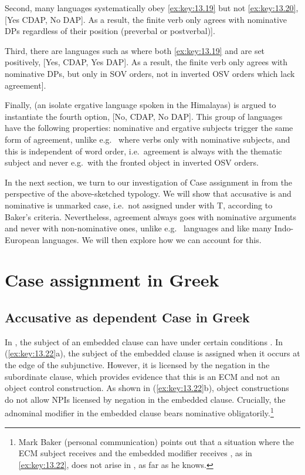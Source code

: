 \documentclass[output=paper]{langsci/langscibook}
\begin{document}
Second, many  languages systematically obey \eqref{ex:key:13.19} but
not \eqref{ex:key:13.20}, [Yes CDAP, No DAP]. As a result, the finite verb only
agrees with nominative DPs regardless of their position (preverbal or
postverbal)].

Third, there are languages such as  where both \eqref{ex:key:13.19} and
 are set positively, [Yes, CDAP, Yes DAP]. As a result, the
finite verb only agrees with nominative DPs, but only in SOV orders, not in
inverted OSV orders which lack agreement].

Finally,  (an isolate ergative language spoken in the Himalayas) is
argued to instantiate the fourth option, [No, CDAP, No DAP]. This group of
languages have the following properties: nominative and ergative subjects
trigger the same form of agreement, unlike e.g.\  where verbs  only
with nominative subjects, and this is independent of word order, i.e.\ agreement
is always with the thematic subject and never e.g.\ with the fronted object in
inverted OSV orders.

In the next section, we turn to our investigation of Case assignment in
 from the perspective of the above-sketched typology. We will show
that accusative is  and
nominative is unmarked case, i.e.\ not assigned under
 with T, according to Baker’s criteria. Nevertheless, agreement
always goes with nominative arguments and never with
non-nominative ones, unlike e.g.\  languages and like many Indo-European
languages. We will then explore how we can account for this.

\section{Case assignment in Greek}

\subsection{Accusative as dependent Case in Greek}

In , the subject of an embedded clause can have \Acc{} under certain
conditions \parencite{Iatridou1993,KotzPapa2007}. In (\ref{ex:key:13.22}a), the
subject of the embedded clause is assigned \Acc{} when it occurs at the edge of
the subjunctive. However, it is licensed by the negation in the subordinate
clause, which provides evidence that this is an \gls{ECM} and not an object
control construction. As shown in (\ref{ex:key:13.22}b), object 
constructions do not allow \glspl{NPI} licensed by negation in the embedded
clause.  Crucially, the adnominal modifier in the embedded clause bears
nominative obligatorily.\footnote{Mark Baker (personal
    communication) points out that a situation where the \gls{ECM} subject
receives \Acc{} and the embedded modifier receives \Nom{}, as in
\eqref{ex:key:13.22}, does not arise in , as far as he knows.}
\end{document}
